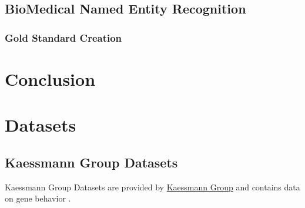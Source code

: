 \documentclass[11pt,titlepage,oneside,openany]{book}
\begin{document}
\section{BioMedical Named Entity Recognition}
\subsection{Gold Standard Creation}

\chapter{Conclusion}
\label{cha:conclusion}




\appendix

\chapter{Datasets}
\label{cha:Datasets}

\section{Kaessmann Group Datasets}
\label{kaessmannds}
Kaessmann Group Datasets are provided by \href{https://www.zmbh.uni-heidelberg.de/kaessmann/}{Kaessmann Group} and contains data on gene behavior \cite{CardosoMoreira2019GeneEA}.
\end{document}
